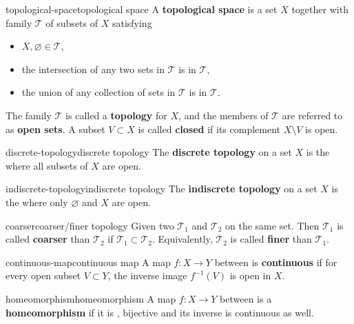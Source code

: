 \begin{topic}{topological-space}{topological space}
    A \textbf{topological space} is a set $X$ together with family $\mathcal{T}$ of subsets of $X$ satisfying
    \begin{itemize}
        \item $X, \varnothing \in \mathcal{T}$,
        \item the intersection of any two sets in $\mathcal{T}$ is in $\mathcal{T}$,
        \item the union of any collection of sets in $\mathcal{T}$ is in $\mathcal{T}$.
    \end{itemize}
    The family $\mathcal{T}$ is called a \textbf{topology} for $X$, and the members of $\mathcal{T}$ are referred to as \textbf{open sets}. A subset $V \subset X$ is called \textbf{closed} if its complement $X \setminus V$ is open.
\end{topic}

\begin{topic}{discrete-topology}{discrete topology}
    The \textbf{discrete topology} on a set $X$ is the  where all subsets of $X$ are open.
\end{topic}

\begin{topic}{indiscrete-topology}{indiscrete topology}
    The \textbf{indiscrete topology} on a set $X$ is the  where only $\varnothing$ and $X$ are open.
\end{topic}

\begin{topic}{coarser}{coarser/finer topology}
    Given two  $\mathcal{T}_1$ and $\mathcal{T}_2$ on the same set. Then $\mathcal{T}_1$ is called \textbf{coarser} than $\mathcal{T}_2$ if $\mathcal{T}_1 \subset \mathcal{T}_2$. Equivalently, $\mathcal{T}_2$ is called \textbf{finer} than $\mathcal{T}_1$.
\end{topic}

\begin{topic}{continuous-map}{continuous map}
    A map $f \colon X \to Y$ between  is \textbf{continuous} if for every open subset $V \subset Y$, the inverse image $f^{-1}(V)$ is open in $X$.
\end{topic}

\begin{topic}{homeomorphism}{homeomorphism}
    A map $f \colon X \to Y$ between  is a \textbf{homeomorphism} if it is , bijective and its inverse is continuous as well.
\end{topic}

